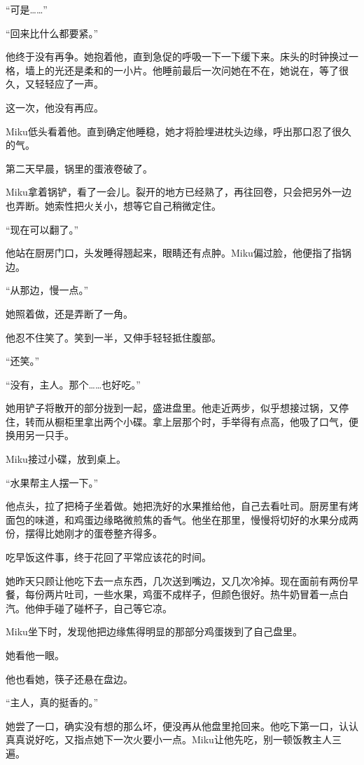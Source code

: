 “可是……”

“回来比什么都要紧。”

他终于没有再争。她抱着他，直到急促的呼吸一下一下缓下来。床头的时钟换过一格，墙上的光还是柔和的一小片。他睡前最后一次问她在不在，她说在，等了很久，又轻轻应了一声。

这一次，他没有再应。

Miku低头看着他。直到确定他睡稳，她才将脸埋进枕头边缘，呼出那口忍了很久的气。

\SceneBreak

第二天早晨，锅里的蛋液卷破了。

Miku拿着锅铲，看了一会儿。裂开的地方已经熟了，再往回卷，只会把另外一边也弄断。她索性把火关小，想等它自己稍微定住。

“现在可以翻了。”

他站在厨房门口，头发睡得翘起来，眼睛还有点肿。Miku偏过脸，他便指了指锅边。

“从那边，慢一点。”

她照着做，还是弄断了一角。

他忍不住笑了。笑到一半，又伸手轻轻抵住腹部。

“还笑。”

“没有，主人。那个……也好吃。”

她用铲子将散开的部分拢到一起，盛进盘里。他走近两步，似乎想接过锅，又停住，转而从橱柜里拿出两个小碟。拿上层那个时，手举得有点高，他吸了口气，便换用另一只手。

Miku接过小碟，放到桌上。

“水果帮主人摆一下。”

他点头，拉了把椅子坐着做。她把洗好的水果推给他，自己去看吐司。厨房里有烤面包的味道，和鸡蛋边缘略微煎焦的香气。他坐在那里，慢慢将切好的水果分成两份，摆得比她刚才的蛋卷整齐得多。

吃早饭这件事，终于花回了平常应该花的时间。

她昨天只顾让他吃下去一点东西，几次送到嘴边，又几次冷掉。现在面前有两份早餐，每份两片吐司，一些水果，鸡蛋不成样子，但颜色很好。热牛奶冒着一点白汽。他伸手碰了碰杯子，自己等它凉。

Miku坐下时，发现他把边缘焦得明显的那部分鸡蛋拨到了自己盘里。

她看他一眼。

他也看她，筷子还悬在盘边。

“主人，真的挺香的。”

她尝了一口，确实没有想的那么坏，便没再从他盘里抢回来。他吃下第一口，认认真真说好吃，又指点她下一次火要小一点。Miku让他先吃，别一顿饭教主人三遍。

